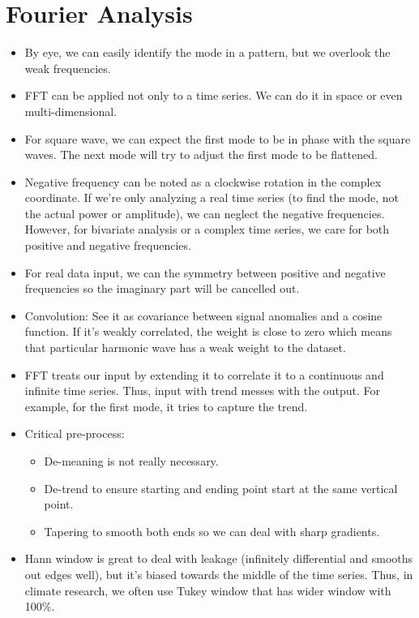 \documentclass{article}
\begin{document}
\section{Fourier Analysis}
\begin{itemize}
    \item By eye, we can easily identify the mode in a pattern, but we overlook the weak frequencies.
    \item FFT can be applied not only to a time series. We can do it in space or even multi-dimensional.
    \item For square wave, we can expect the first mode to be in phase with the square waves. The next mode will try to adjust the first mode to be flattened.
    \item Negative frequency can be noted as a clockwise rotation in the complex coordinate. If we're only analyzing a real time series (to find the mode, not the actual power or amplitude), we can neglect the negative frequencies. However, for bivariate analysis or a complex time series, we care for both positive and negative frequencies.
    \item For real data input, we can the symmetry between positive and negative frequencies so the imaginary part will be cancelled out.
    \item Convolution: See it as covariance between signal anomalies and a cosine function. If it's weakly correlated, the weight is close to zero which means that particular harmonic wave has a weak weight to the dataset.
    \item FFT treats our input by extending it to correlate it to a continuous and infinite time series. Thus, input with trend messes with the output. For example, for the first mode, it tries to capture the trend.
    \item Critical pre-process: 
    \begin{itemize}
        \item De-meaning is not really necessary.
        \item De-trend to ensure starting and ending point start at the same vertical point.
        \item Tapering to smooth both ends so we can deal with sharp gradients.
    \end{itemize}
    \item Hann window is great to deal with leakage (infinitely differential and smooths out edges well), but it's biased towards the middle of the time series. Thus, in climate research, we often use Tukey window that has wider window with 100\%.

\end{itemize}
\end{document}
